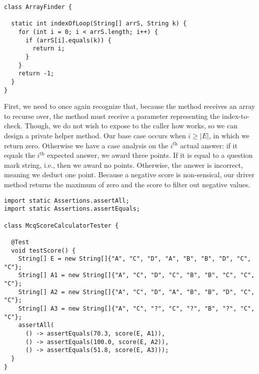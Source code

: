 \begin{lstlisting}[language=MyJava]
class ArrayFinder {
  
  static int indexOfLoop(String[] arrS, String k) {
    for (int i = 0; i < arrS.length; i++) {
      if (arrS[i].equals(k)) { 
        return i; 
      }
    }
    return -1;
  }
}
\end{lstlisting}


First, we need to once again recognize that, because the method receives an array to recurse over, the method must receive a parameter representing the index-to-check. Though, we do not wish to expose to the caller how  works, so we can design a private helper method. Our base case occurs when $i \geq |E|$, in which we return zero. Otherwise we have a case analysis on the $i^\text{th}$ actual answer: if it equals the $i^\text{th}$ expected answer, we award three points. If it is equal to a question mark string, i.e.,  then we award no points. Otherwise, the answer is incorrect, meaning we deduct one point. Because a negative score is non-sensical, our driver method returns the maximum of zero and the score to filter out negative values.

\begin{lstlisting}[language=MyJava]
import static Assertions.assertAll;
import static Assertions.assertEquals;

class McqScoreCalculatorTester {

  @Test
  void testScore() {    
    String[] E = new String[]{"A", "C", "D", "A", "B", "B", "D", "C", "C"};
    String[] A1 = new String[]{"A", "C", "D", "C", "B", "B", "C", "C", "C"};
    String[] A2 = new String[]{"A", "C", "D", "A", "B", "B", "D", "C", "C"};
    String[] A3 = new String[]{"A", "C", "?", "C", "?", "B", "?", "C", "C"};
    assertAll(
      () -> assertEquals(70.3, score(E, A1)),
      () -> assertEquals(100.0, score(E, A2)),
      () -> assertEquals(51.8, score(E, A3)));
  }
}
\end{lstlisting}

